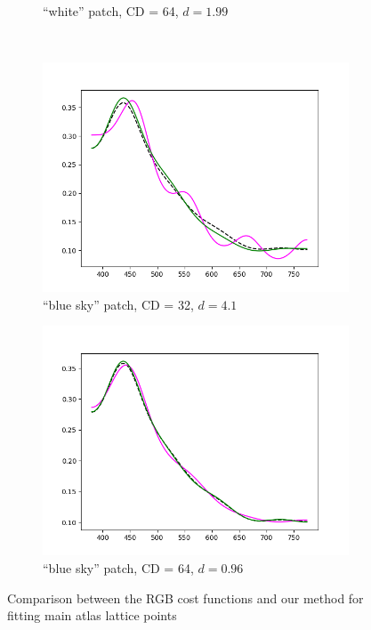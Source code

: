 \begin{figure}[t]
\begin{subfigure}[t]{0.45\textwidth}
		\caption{``white'' patch, CD = 64, $d = 1.99$}
		\label{fig:resultsCostFunctions_white64}
	\end{subfigure} \hspace{0.1em}
	\vspace{0.5em}\\
	\begin{subfigure}[t]{0.45\textwidth}
		\includegraphics[width=\linewidth]{img/results_costFunctions_bs_cd32.png}
		\caption{``blue sky'' patch, CD = 32, $d = 4.1$}
		\label{fig:resultsCostFunctions_bs32}
	\end{subfigure} \hspace{0.1em}
	\begin{subfigure}[t]{0.45\textwidth}
		\includegraphics[width=\linewidth]{img/results_costFunctions_bs_cd64.png}
		\caption{``blue sky'' patch, CD = 64, $d = 0.96$}
		\label{fig:resultsCostFunctions_bs64}
	\end{subfigure}
	\caption{Comparison between the RGB cost functions and our method for fitting main atlas lattice points}
	\label{fig:resultsCostFunctions}
\end{figure}

